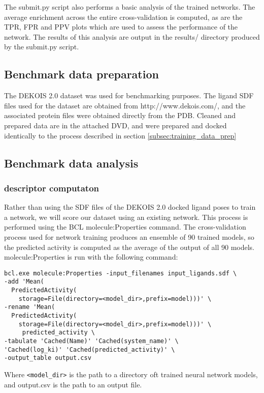 The submit.py script also performs a basic analysis of the trained networks.
The average enrichment across the entire cross-validation is computed, as are the TPR, FPR and PPV plots which are used to assess the performance of the network.
The results of this analysis are output in the results/ directory produced by the submit.py script.

\subsection{Benchmark data preparation}

The DEKOIS 2.0\citep{Bauer:2013de} dataset was used for benchmarking purposes.
The ligand SDF files used for the dataset are obtained from http://www.dekois.com/, and the associated protein files were obtained directly from the PDB. 
Cleaned and prepared data are in the attached DVD, and were prepared and docked identically to the process described in section \ref{subsec:training_data_prep}

\subsection{Benchmark data analysis}

\subsubsection{descriptor computaton}
Rather than using the SDF files of the DEKOIS 2.0 docked ligand poses to train a network, we will score our dataset using an existing network.
This process is performed using the BCL molecule:Properties command.
The cross-validation process used for network training produces an ensemble of 90 trained models, so the predicted activity is computed as the average of the output of all 90 models.
molecule:Properties is run with the following command:
\singlespace
\begin{verbatim}
bcl.exe molecule:Properties -input_filenames input_ligands.sdf \
-add 'Mean(
  PredictedActivity(
    storage=File(directory=<model_dir>,prefix=model)))' \
-rename 'Mean(
  PredictedActivity(
    storage=File(directory=<model_dir>,prefix=model)))' \
     predicted_activity \
-tabulate 'Cached(Name)' 'Cached(system_name)' \
'Cached(log_ki)' 'Cached(predicted_activity)' \
-output_table output.csv
\end{verbatim}
\doublespace
Where \texttt{<model\_dir>} is the path to a directory oft trained neural network models, and output.csv is the path to an output file.

